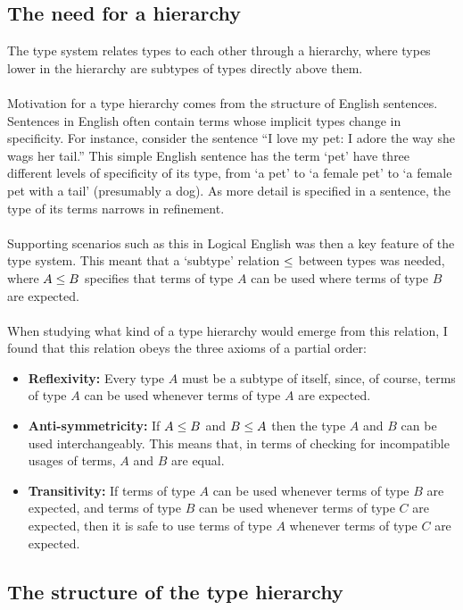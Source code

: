 \documentclass[../main.tex]{subfiles}
\begin{document}
\subsection{The need for a hierarchy}
The type system relates types to each other through a hierarchy, where types lower in the hierarchy are subtypes of types directly above them.
\\
\\
Motivation for a type hierarchy comes from the structure of English sentences. Sentences in English often contain terms whose implicit types change in specificity. 
For instance, consider the sentence ``I love my pet: I adore the way she wags her tail.'' This simple English sentence has the term `pet' have three different levels of specificity of its type, from `a pet' to `a female pet' to `a female pet with a tail' (presumably a dog). As more detail is specified in a sentence, the type of its terms narrows in refinement. 
\\
\\
Supporting scenarios such as this in Logical English was then a key feature of the type system. This meant that a `subtype' relation $\leq$ between types was needed, where $A \leq B$ specifies that terms of type $A$ can be used where terms of type $B$ are expected. 
\\
\\
When studying what kind of a type hierarchy would emerge from this relation, I found that this relation obeys the three axioms of a partial order:
\begin{itemize}
    \item \textbf{Reflexivity:} Every type $A$ must be a subtype of itself, since, of course, terms of type $A$ can be used whenever terms of type $A$ are expected.
    \item \textbf{Anti-symmetricity:} If $A \leq B$ and $B \leq A$ then the type $A$ and $B$ can be used interchangeably. This means that, in terms of checking for incompatible usages of terms, $A$ and $B$ are equal. 
    \item \textbf{Transitivity:} If terms of type $A$ can be used whenever terms of type $B$ are expected, and terms of type $B$ can be used whenever terms of type $C$ are expected, then it is safe to use terms of type $A$ whenever terms of type $C$ are expected.
\end{itemize}

\subsection{The structure of the type hierarchy}
\end{document}

